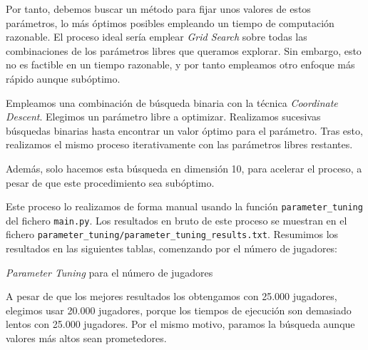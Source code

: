 \documentclass[11pt]{article}
\begin{document}
Por tanto, debemos buscar un método para fijar unos valores de estos parámetros, lo más óptimos posibles empleando un tiempo de computación razonable. El proceso ideal sería emplear \emph{Grid Search} sobre todas las combinaciones de los parámetros libres que queramos explorar. Sin embargo, esto no es factible en un tiempo razonable, y por tanto empleamos otro enfoque más rápido aunque subóptimo.

Empleamos una combinación de búsqueda binaria con la técnica \emph{Coordinate Descent}. Elegimos un parámetro libre a optimizar. Realizamos sucesivas búsquedas binarias hasta encontrar un valor óptimo para el parámetro. Tras esto, realizamos el mismo proceso iterativamente con las parámetros libres restantes.

Además, solo hacemos esta búsqueda en dimensión 10, para acelerar el proceso, a pesar de que este procedimiento sea subóptimo.

Este proceso lo realizamos de forma manual usando la función \lstinline{parameter_tuning} del fichero \lstinline{main.py}. Los resultados en bruto de este proceso se muestran en el fichero \lstinline{parameter_tuning/parameter_tuning_results.txt}. Resumimos los resultados en las siguientes tablas, comenzando por el número de jugadores:

\begin{table}[H]
    \centering
    \caption{\emph{Parameter Tuning} para el número de jugadores}
\end{table}

A pesar de que los mejores resultados los obtengamos con 25.000 jugadores, elegimos usar 20.000 jugadores, porque los tiempos de ejecución son demasiado lentos con 25.000 jugadores. Por el mismo motivo, paramos la búsqueda aunque valores más altos sean prometedores.
\end{document}
